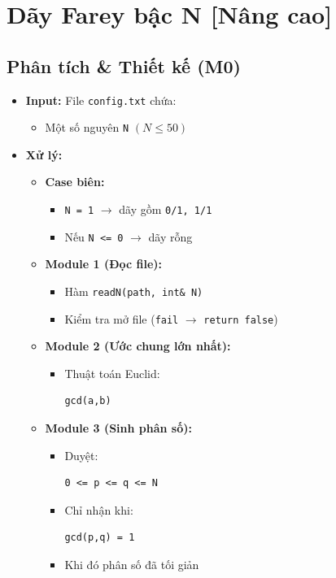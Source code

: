 \section{Dãy Farey bậc N [Nâng cao]}
\subsection{Phân tích \& Thiết kế (M0)}
\begin{itemize}
    \item \textbf{Input:}
    File \texttt{config.txt} chứa:
    \begin{itemize}
        \item Một số nguyên \texttt{N} $(N \le 50)$
    \end{itemize}

    \item \textbf{Xử lý:}
    \begin{itemize}
        \item \textbf{Case biên:}
        \begin{itemize}
            \item \texttt{N = 1} $\rightarrow$ dãy gồm \texttt{0/1, 1/1}
            \item Nếu \texttt{N <= 0} $\rightarrow$ dãy rỗng
        \end{itemize}

        \item \textbf{Module 1 (Đọc file):}
        \begin{itemize}
            \item Hàm \texttt{readN(path, int\& N)}
            \item Kiểm tra mở file (\texttt{fail} $\rightarrow$ \texttt{return false})
        \end{itemize}

        \item \textbf{Module 2 (Ước chung lớn nhất):}
        \begin{itemize}
            \item Thuật toán Euclid:
            \begin{lstlisting}
gcd(a,b)
            \end{lstlisting}
        \end{itemize}

        \item \textbf{Module 3 (Sinh phân số):}
        \begin{itemize}
            \item Duyệt:
            \begin{lstlisting}
0 <= p <= q <= N
            \end{lstlisting}
            \item Chỉ nhận khi:
            \begin{lstlisting}
gcd(p,q) = 1
            \end{lstlisting}
            \item Khi đó phân số đã tối giản
        \end{itemize}


\end{itemize}
\end{itemize}
